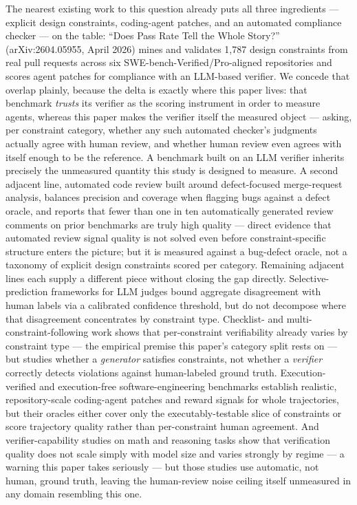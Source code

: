 \documentclass[11pt]{article}
\begin{document}
The nearest existing work to this question already puts all three ingredients --- explicit design constraints, coding-agent patches, and an automated compliance checker --- on the table: ``Does Pass Rate Tell the Whole Story?'' (arXiv:2604.05955, April 2026) mines and validates 1{,}787 design constraints from real pull requests across six SWE-bench-Verified/Pro-aligned repositories and scores agent patches for compliance with an LLM-based verifier. We concede that overlap plainly, because the delta is exactly where this paper lives: that benchmark \emph{trusts} its verifier as the scoring instrument in order to measure agents, whereas this paper makes the verifier itself the measured object --- asking, per constraint category, whether any such automated checker's judgments actually agree with human review, and whether human review even agrees with itself enough to be the reference. A benchmark built on an LLM verifier inherits precisely the unmeasured quantity this study is designed to measure. A second adjacent line, automated code review built around defect-focused merge-request analysis, balances precision and coverage when flagging bugs against a defect oracle, and reports that fewer than one in ten automatically generated review comments on prior benchmarks are truly high quality --- direct evidence that automated review signal quality is not solved even before constraint-specific structure enters the picture; but it is measured against a bug-defect oracle, not a taxonomy of explicit design constraints scored per category. Remaining adjacent lines each supply a different piece without closing the gap directly. Selective-prediction frameworks for LLM judges bound aggregate disagreement with human labels via a calibrated confidence threshold, but do not decompose where that disagreement concentrates by constraint type. Checklist- and multi-constraint-following work shows that per-constraint verifiability already varies by constraint type --- the empirical premise this paper's category split rests on --- but studies whether a \emph{generator} satisfies constraints, not whether a \emph{verifier} correctly detects violations against human-labeled ground truth. Execution-verified and execution-free software-engineering benchmarks establish realistic, repository-scale coding-agent patches and reward signals for whole trajectories, but their oracles either cover only the executably-testable slice of constraints or score trajectory quality rather than per-constraint human agreement. And verifier-capability studies on math and reasoning tasks show that verification quality does not scale simply with model size and varies strongly by regime --- a warning this paper takes seriously --- but those studies use automatic, not human, ground truth, leaving the human-review noise ceiling itself unmeasured in any domain resembling this one.
\end{document}
